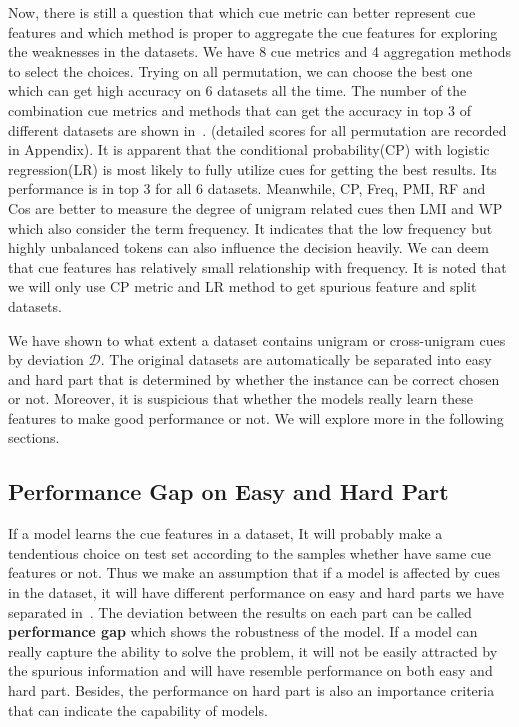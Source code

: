 Now, there is still a question that which cue metric can better represent cue features 
 and which method is proper to aggregate the cue features 
 for exploring the weaknesses in the datasets. We have 8 cue metrics and 4 aggregation 
 methods to select the choices. Trying on all permutation, we can choose the 
 best one which can get high accuracy on 6 datasets all the time. 
 The number of the combination cue metrics and methods that can get the accuracy in top 3 of 
 different datasets are shown in~. (detailed scores for all permutation are recorded
in Appendix).
 It is apparent that  the conditional probability(CP) with logistic regression(LR) is 
 most likely to fully utilize cues for getting the best results. Its performance is in top 3 
 for all 6 datasets. Meanwhile, 
 CP, Freq, PMI, RF and Cos are better to measure the degree of unigram related cues then LMI 
 and WP which also consider the term frequency. It indicates that the low frequency but 
 highly unbalanced tokens can also influence the decision heavily. 
 We can deem that cue features has relatively small 
 relationship with frequency. It is noted that we will only use CP metric and LR 
 method to get spurious feature and split datasets.
 
 
 We have shown to what extent a dataset 
 contains unigram or cross-unigram cues by deviation $\mathcal{D}$. The original datasets are 
 automatically be separated into easy and hard part that is determined by whether the instance 
 can be correct chosen or not.
 Moreover, it is suspicious that whether the models really learn these features 
 to make good performance or not. We will explore more in the following sections.
 
 
\subsection{Performance Gap on Easy and Hard Part}
\label{sec:experiment2}
If a model learns the cue features in a dataset, It 
 will probably make a tendentious choice on 
 test set according to the samples whether have same cue features or not. 
 Thus we make an assumption that if a model is affected by cues 
in the dataset, it will have different performance on easy and hard parts 
we have 
 separated in~.
 The deviation between the results on each part can be called \textbf{performance gap} 
 which shows the robustness of the model. %
 If a model 
 can really capture the ability to solve the problem, it will not be easily attracted by 
 the spurious information and will have resemble performance on both easy and hard 
 part. Besides, the performance on hard part is also an importance criteria that
 can indicate the capability of models.

